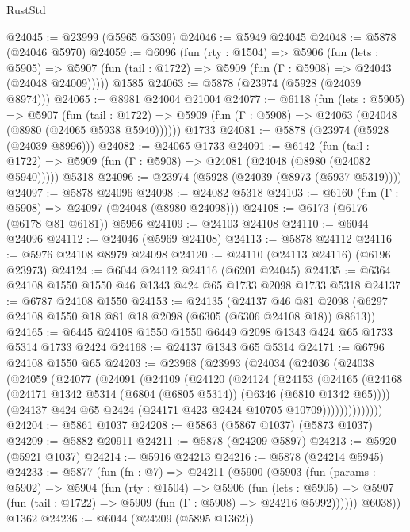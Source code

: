 \begin{lexlean}{RustStd}
\begin{coremodule}
@24045 := @23999 (@5965 @5309)
@24046 := @5949 @24045
@24048 := @5878 (@24046 @5970)
@24059 := @6096
    (fun (rty : @1504) =>
    @5906
      (fun (lets : @5905) =>
      @5907 (fun (tail : @1722) => @5909 (fun (Γ : @5908) => @24043 (@24048 @24009)))))
    @1585
@24063 := @5878 (@23974 (@5928 (@24039 @8974)))
@24065 := @8981 @24004 @21004
@24077 := @6118
    (fun (lets : @5905) =>
    @5907
      (fun (tail : @1722) =>
      @5909 (fun (Γ : @5908) => @24063 (@24048 (@8980 (@24065 @5938 @5940))))))
    @1733
@24081 := @5878 (@23974 (@5928 (@24039 @8996)))
@24082 := @24065 @1733
@24091 := @6142
    (fun (tail : @1722) => @5909 (fun (Γ : @5908) => @24081 (@24048 (@8980 (@24082 @5940)))))
    @5318
@24096 := @23974 (@5928 (@24039 (@8973 (@5937 @5319))))
@24097 := @5878 @24096
@24098 := @24082 @5318
@24103 := @6160 (fun (Γ : @5908) => @24097 (@24048 (@8980 @24098)))
@24108 := @6173 (@6176 (@6178 @81 @6181)) @5956
@24109 := @24103 @24108
@24110 := @6044 @24096
@24112 := @24046 (@5969 @24108)
@24113 := @5878 @24112
@24116 := @5976 @24108 @8979 @24098
@24120 := @24110 (@24113 @24116) (@6196 @23973)
@24124 := @6044 @24112 @24116 (@6201 @24045)
@24135 := @6364 @24108 @1550 @1550 @46 @1343 @424 @65 @1733 @2098 @1733 @5318
@24137 := @6787 @24108 @1550
@24153 := @24135
    (@24137 @46 @81 @2098 (@6297 @24108 @1550 @18 @81 @18 @2098 (@6305 (@6306 @24108 @18)) @8613))
@24165 := @6445 @24108 @1550 @1550 @6449 @2098 @1343 @424 @65 @1733 @5314 @1733 @2424
@24168 := @24137 @1343 @65 @5314
@24171 := @6796 @24108 @1550 @65
@24203 := @23968
    (@23993
      (@24034
        (@24036
          (@24038
            (@24059
              (@24077
                (@24091
                  (@24109
                    (@24120
                      (@24124
                        (@24153
                          (@24165
                            (@24168
                              (@24171 @1342 @5314 (@6804 (@6805 @5314)) (@6346 (@6810 @1342 @65))))
                            (@24137 @424 @65 @2424 (@24171 @423 @2424 @10705 @10709))))))))))))))
@24204 := @5861 @1037
@24208 := @5863 (@5867 @1037) (@5873 @1037)
@24209 := @5882 @20911
@24211 := @5878 (@24209 @5897)
@24213 := @5920 (@5921 @1037)
@24214 := @5916 @24213
@24216 := @5878 (@24214 @5945)
@24233 := @5877
    (fun (fn : @7) =>
    @24211
      (@5900
        (@5903
          (fun (params : @5902) =>
          @5904
            (fun (rty : @1504) =>
            @5906
              (fun (lets : @5905) =>
              @5907 (fun (tail : @1722) => @5909 (fun (Γ : @5908) => @24216 @5992))))))
        @6038))
    @1362
@24236 := @6044 (@24209 (@5895 @1362))

\end{coremodule}
\end{lexlean}
